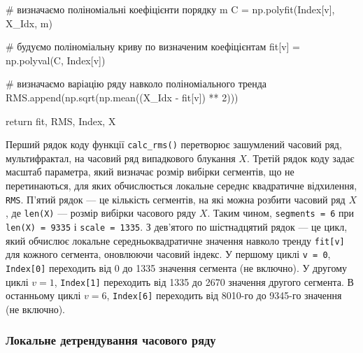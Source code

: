 \documentclass[
  letterpaper,
]{report}
\newenvironment{Shaded}{\begin{snugshade}}{\end{snugshade}}
\newcommand{\CommentTok}[1]{\textcolor[rgb]{0.37,0.37,0.37}{#1}}
\newcommand{\ControlFlowTok}[1]{\textcolor[rgb]{0.00,0.23,0.31}{#1}}
\newcommand{\DecValTok}[1]{\textcolor[rgb]{0.68,0.00,0.00}{#1}}
\newcommand{\NormalTok}[1]{\textcolor[rgb]{0.00,0.23,0.31}{#1}}
\newcommand{\OperatorTok}[1]{\textcolor[rgb]{0.37,0.37,0.37}{#1}}
\begin{document}
\begin{Shaded}
\begin{Highlighting}[]
        \CommentTok{\# визначаємо поліноміальні коефіцієнти порядку m}
\NormalTok{        C }\OperatorTok{=}\NormalTok{ np.polyfit(Index[v], X\_Idx, m) }

        \CommentTok{\# будуємо поліноміальну криву по визначеним коефіцієнтам}
\NormalTok{        fit[v] }\OperatorTok{=}\NormalTok{ np.polyval(C, Index[v])         }
                 
        \CommentTok{\# визначаємо варіацію ряду навколо поліноміального тренда}
\NormalTok{        RMS.append(np.sqrt(np.mean((X\_Idx }\OperatorTok{{-}}\NormalTok{ fit[v]) }\OperatorTok{**} \DecValTok{2}\NormalTok{)))  }

    \ControlFlowTok{return}\NormalTok{ fit, RMS, Index, X}
\end{Highlighting}
\end{Shaded}

Перший рядок коду функції \texttt{calc\_rms()} перетворює зашумлений
часовий ряд, мультифрактал, на часовий ряд випадкового блукання \(X\).
Третій рядок коду задає масштаб параметра, який визначає розмір вибірки
сегментів, що не перетинаються, для яких обчислюється локальне середнє
квадратичне відхилення, \texttt{RMS}. П'ятий рядок --- це кількість
сегментів, на які можна розбити часовий ряд \(X\), де \texttt{len(X)}
--- розмір вибірки часового ряду \(X\). Таким чином,
\texttt{segments\ =\ 6} при \texttt{len(X)\ =\ 9335} і
\texttt{scale\ =\ 1335}. З дев'ятого по шістнадцятий рядок --- це цикл,
який обчислює локальне середньоквадратичне значення навколо тренду
\texttt{fit{[}v{]}} для кожного сегмента, оновлюючи часовий індекс. У
першому циклі \texttt{v\ =\ 0}, \texttt{Index{[}0{]}} переходить від 0
до 1335 значення сегмента (не включно). У другому циклі \(v = 1\),
\texttt{Index{[}1{]}} переходить від 1335 до 2670 значення другого
сегмента. В останньому циклі \(v = 6\), \texttt{Index{[}6{]}} переходить
від 8010-го до 9345-го значення (не включно).

\hypertarget{ux43bux43eux43aux430ux43bux44cux43dux435-ux434ux435ux442ux440ux435ux43dux434ux443ux432ux430ux43dux43dux44f-ux447ux430ux441ux43eux432ux43eux433ux43e-ux440ux44fux434ux443}{%
\subsubsection{Локальне детрендування часового
ряду}\label{ux43bux43eux43aux430ux43bux44cux43dux435-ux434ux435ux442ux440ux435ux43dux434ux443ux432ux430ux43dux43dux44f-ux447ux430ux441ux43eux432ux43eux433ux43e-ux440ux44fux434ux443}}
\end{document}
